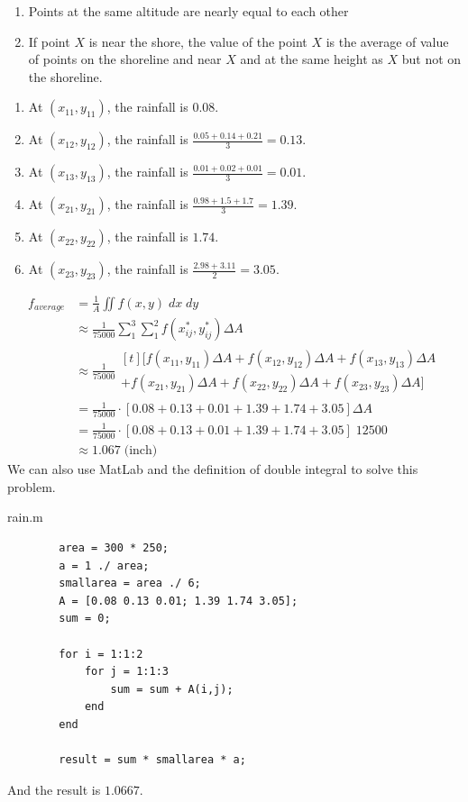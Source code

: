 \documentclass[a4paper]{article}
\begin{document}
	\begin{enumerate}[label=$\cdot$]
		\item Points at the same altitude are nearly equal to each other
		\item If point $X$ is near the shore, the value of the point $X$ is the average of value of points on the shoreline and near $X$ and at the same height as $X$ but not on the shoreline.
	\end{enumerate}
	\begin{enumerate}[label=$\bullet$]
		\item At $(x_{11}, y_{11})$, the rainfall is $0.08$.
		\item At $(x_{12}, y_{12})$, the rainfall is $\frac{0.05+0.14+0.21}{3}=0.13$.
		\item At $(x_{13}, y_{13})$, the rainfall is $\frac{0.01+0.02+0.01}{3}=0.01$.
		\item At $(x_{21}, y_{21})$, the rainfall is $\frac{0.98+1.5+1.7}{3}=1.39$.
		\item At $(x_{22}, y_{22})$, the rainfall is $1.74$.
		\item At $(x_{23}, y_{23})$, the rainfall is $\frac{2.98+3.11}{2}=3.05$.
	\end{enumerate}
	\begin{align*}
	f_{average} & = \frac{1}{A}\iint f(x,y)\;dx\;dy \\
	& \approx \frac{1}{75000} \sum_{1}^{3} \sum_{1}^{2} f(x_{ij}^{*}, y_{ij}^{*}) \Delta A \\
	& \approx \frac{1}{75000} \begin{multlined}[t]
	\bigl[f(x_{11}, y_{11}) \Delta A + f(x_{12}, y_{12}) \Delta A + f(x_{13}, y_{13}) \Delta A \\
	+ f(x_{21}, y_{21}) \Delta A + f(x_{22}, y_{22}) \Delta A + f(x_{23}, y_{23}) \Delta A\bigr]
	\end{multlined} \\
	& = \frac{1}{75000} \cdot [0.08 + 0.13 + 0.01 + 1.39 + 1.74 + 3.05] \Delta A \\
	& = \frac{1}{75000} \cdot [0.08 + 0.13 + 0.01 + 1.39 + 1.74 + 3.05]\; 12500 \\
	& \approx 1.067\;\text{(inch)}
	\end{align*}
	We can also use MatLab and the definition of double integral to solve this problem.
	\begin{mdframed}[hidealllines=true,backgroundcolor=magenta!10]
		rain.m
		\begin{lstlisting}
		area = 300 * 250;
		a = 1 ./ area;
		smallarea = area ./ 6;
		A = [0.08 0.13 0.01; 1.39 1.74 3.05];
		sum = 0;
		
		for i = 1:1:2
			for j = 1:1:3
				sum = sum + A(i,j);
			end
		end
		
		result = sum * smallarea * a;
		\end{lstlisting}
	\end{mdframed}
	And the result is $1.0667$.
	
\end{document}
